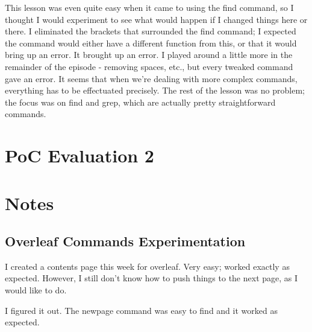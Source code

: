 \documentclass{article}
\begin{document}
This lesson was even quite easy when it came to using the find command, so I thought I would experiment to see what would happen if I changed things here or there. I eliminated the brackets that surrounded the find command; I expected the command would either have a different function from this, or that it would bring up an error. It brought up an error. I played around a little more in the remainder of the episode - removing spaces, etc., but every tweaked command gave an error. It seems that when we're dealing with more complex commands, everything has to be effectuated precisely. The rest of the lesson was no problem; the focus was on find and grep, which are actually pretty straightforward commands.

\section{PoC Evaluation 2}

\section{Notes}
\subsection{Overleaf Commands Experimentation}
I created a contents page this week for overleaf. Very easy; worked exactly as expected. However, I still don't know how to push things to the next page, as I would like to do.

I figured it out. The newpage command was easy to find and it worked as expected.
\end{document}
